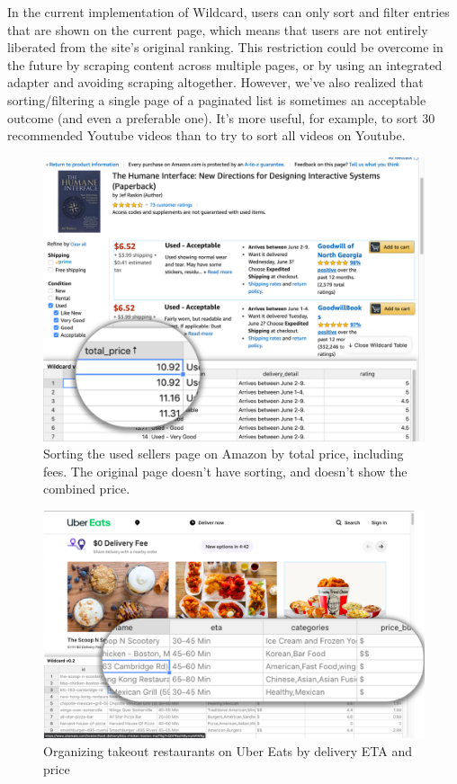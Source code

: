 \documentclass[sigplan,screen,10pt,anonymous,review]{acmart}
\begin{document}
In the current implementation of Wildcard, users can only sort and
filter entries that are shown on the current page, which means that
users are not entirely liberated from the site's original ranking. This
restriction could be overcome in the future by scraping content across
multiple pages, or by using an integrated adapter and avoiding scraping
altogether. However, we've also realized that sorting/filtering a single
page of a paginated list is sometimes an acceptable outcome (and even a
preferable one). It's more useful, for example, to sort 30 recommended
Youtube videos than to try to sort all videos on Youtube.

\begin{figure}
\hypertarget{fig:amazon}{%
\centering
\includegraphics[width=\columnwidth]{media/amazon.png}
\caption{Sorting the used sellers page on Amazon by total price, including fees. The original page doesn't have sorting, and doesn't show the combined price.}\label{fig:amazon}
}
\end{figure}

\begin{figure}
\hypertarget{fig:ubereats}{%
\centering
\includegraphics[width=\columnwidth]{media/ubereats.png}
\caption{Organizing takeout restaurants on Uber Eats by delivery ETA and price}\label{fig:ubereats}
}
\end{figure}
\end{document}
